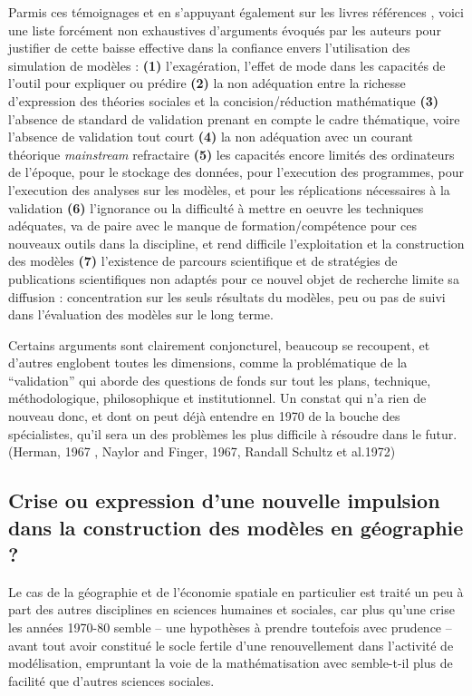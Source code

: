 {Parmis ces témoignages et en s'appuyant également sur les livres références \autocite{Naylor1966,Guetzkow1972,Dutton1971}, voici une liste forcément non exhaustives d'arguments évoqués par les auteurs pour justifier de cette baisse effective dans la confiance envers l'utilisation des simulation de modèles : \textbf{(1)} l'exagération, l'effet de mode dans les capacités de l'outil pour expliquer ou prédire \textbf{(2)} la non adéquation entre la richesse d'expression des théories sociales et la concision/réduction mathématique \textbf{(3)} l'absence de standard de validation prenant en compte le cadre thématique, voire l'absence de validation tout court \textbf{(4)} la non adéquation avec un courant théorique \textit{mainstream} refractaire \textbf{(5)} les capacités encore limités des ordinateurs de l'époque, pour le stockage des données, pour l'execution des programmes, pour l'execution des analyses sur les modèles, et pour les réplications nécessaires à la validation \textbf{(6)} l'ignorance ou la difficulté à mettre en oeuvre les techniques adéquates, va de paire avec le manque de formation/compétence pour ces nouveaux outils dans la discipline, et rend difficile l'exploitation et la construction des modèles \textbf{(7)} l'existence de parcours scientifique et de stratégies de publications scientifiques non adaptés pour ce nouvel objet de recherche limite sa diffusion : concentration sur les seuls résultats du modèles, peu ou pas de suivi dans l'évaluation des modèles sur le long terme.

Certains arguments sont clairement conjoncturel, beaucoup se recoupent, et d'autres englobent toutes les dimensions, comme la problématique de la \enquote{validation} qui aborde des questions de fonds sur tout les plans, technique, méthodologique, philosophique et institutionnel. Un constat qui n'a rien de nouveau donc, et dont on peut déjà entendre en 1970 de la bouche des spécialistes, qu'il sera un des problèmes les plus difficile à résoudre dans le futur. (Herman, 1967 , Naylor and Finger, 1967, Randall Schultz et al.1972)  


\subsection{Crise ou expression d'une nouvelle impulsion dans la construction des modèles en géographie ?}

Le cas de la géographie et de l'économie spatiale en particulier est traité un peu à part des autres disciplines en sciences humaines et sociales, car plus qu'une crise les années 1970-80 semble -- une hypothèses à prendre toutefois avec prudence -- avant tout avoir constitué le socle fertile d'une renouvellement dans l'activité de modélisation, empruntant la voie de la mathématisation avec semble-t-il plus de facilité que d'autres sciences sociales.

}
